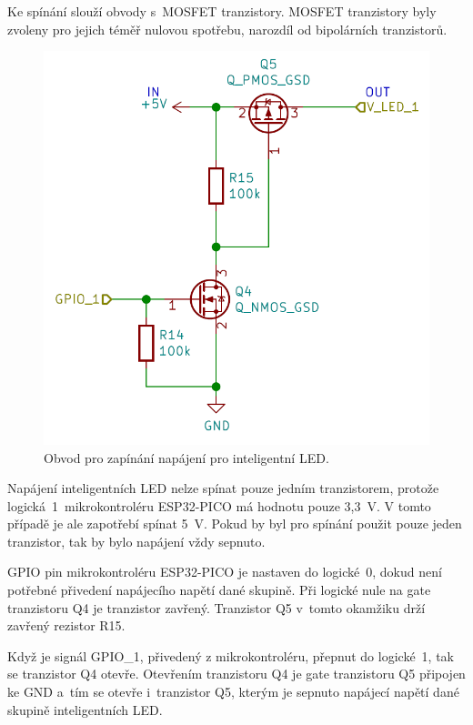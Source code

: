   Ke spínání slouží obvody s~MOSFET tranzistory. MOSFET tranzistory byly zvoleny pro jejich téměř nulovou spotřebu, narozdíl od 
  bipolárních tranzistorů. 

  \begin{figure}[!h]
    \begin{center}
      \includegraphics[scale=0.45]{obrazky/Zapinani_napajeni_LED.png}
    \end{center}
    \caption[Obvod pro zapínání napájení pro inteligentní LED]{Obvod pro zapínání napájení pro inteligentní LED.}
  \end{figure}

  Napájení inteligentních LED nelze spínat pouze jedním tranzistorem, protože logická~1~mikrokontroléru ESP32-PICO má hodnotu pouze 3,3~V. 
  V tomto případě je ale zapotřebí spínat 5~V. Pokud by byl pro spínání použit pouze jeden tranzistor, tak by bylo napájení vždy sepnuto.

  GPIO pin mikrokontroléru ESP32-PICO je nastaven do logické~0, dokud není potřebné přivedení napájecího napětí dané skupině. 
  Při logické nule na gate 
  tranzistoru Q4 je tranzistor zavřený. Tranzistor Q5 v~tomto okamžiku drží zavřený rezistor R15.

  Když je signál GPIO\_1, přivedený z mikrokontroléru, přepnut do logické~1, tak se tranzistor Q4 otevře. Otevřením tranzistoru Q4 je gate tranzistoru Q5 
  připojen ke GND a~tím se otevře i~tranzistor Q5, kterým je sepnuto napájecí napětí dané skupině inteligentních LED.

